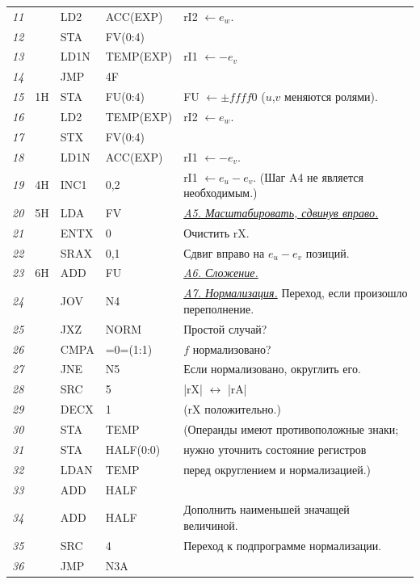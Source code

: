 {\begin{longtable}{l l l l l}
\textit{11}	& & LD2 & ACC(EXP) & rI2 $\leftarrow e_w$.\\
\textit{12}	& & STA & FV(0:4) &\\	
\textit{13}	& & LD1N & TEMP(EXP) & rI1 $\leftarrow -e_v$\\
\textit{14}	& & JMP & 4F &\\	
\textit{15} & 1H & STA & FU(0:4) & FU $\leftarrow \pm f f f f 0$ ($u$,$v$ меняются ролями).\\
\textit{16} & & LD2 & TEMP(EXP) & rI2 $\leftarrow e_w$.\\
\textit{17} & & STX & FV(0:4) &\\	
\textit{18}	& & LD1N & ACC(EXP) & rI1 $\leftarrow -e_v$.\\
\textit{19} & 4H & INC1 & 0,2 & rI1 $\leftarrow e_u - e_v$. (Шаг A4 не является необходимым.)\\
\textit{20} & 5H & LDA & FV & \underline{\textit{A5. Масштабировать, сдвинув вправо.}}\\
\textit{21}	& & ENTX & 0 & Очистить rX.\\
\textit{22} & & SRAX & 0,1 & Сдвиг вправо на $e_u - e_v$ позиций.\\
\textit{23} & 6H & ADD & FU & \underline{\textit{A6. Сложение.}}\\
\textit{24}	& & JOV & N4 & \underline{\textit{A7. Нормализация.}} Переход, если произошло переполнение.\\
\textit{25}	& & JXZ & NORM & Простой случай?\\
\textit{26}	& & CMPA & =0=(1:1) & $f$ нормализовано?\\
\textit{27}	& & JNE & N5 & Если нормализовано, округлить его.\\
\textit{28}	& & SRC & 5 & |rX| $\leftrightarrow$ |rA|\\
\textit{29}	& & DECX & 1 & (rX положительно.)\\
\textit{30}	& & STA & TEMP & (Операнды имеют противоположные знаки;\\
\textit{31}	& & STA & HALF(0:0) & нужно уточнить состояние регистров\\
\textit{32}	& & LDAN & TEMP & перед округлением и нормализацией.)\\
\textit{33}	& & ADD & HALF &\\	
\textit{34}	& & ADD & HALF & Дополнить наименьшей значащей величиной.\\
\textit{35} & & SRC & 4 & Переход к подпрограмме нормализации.\\
\textit{36}	& & JMP & N3A & \\	

\end{longtable}}
